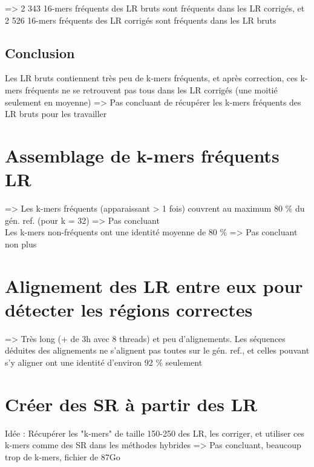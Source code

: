 \documentclass[12pt]{article}
\begin{document}
=> 2 343 16-mers fréquents des LR bruts sont fréquents dans les LR corrigés, et 2 526 16-mers fréquents des LR corrigés sont fréquents dans les LR bruts \\

\subsection{Conclusion}

Les LR bruts contiennent très peu de k-mers fréquents, et après correction, ces k-mers fréquents ne se retrouvent pas tous dans les LR corrigés (une moitié seulement en moyenne) => Pas concluant de récupérer les k-mers fréquents des LR bruts pour les travailler

\section{Assemblage de k-mers fréquents LR}

=> Les k-mers fréquents (apparaissant > 1 fois) couvrent au maximum 80 \% du gén. ref. (pour k = 32) => Pas concluant \\

Les k-mers non-fréquents ont une identité moyenne de 80 \% => Pas concluant non plus

\section{Alignement des LR entre eux pour détecter les régions correctes}

=> Très long (+ de 3h avec 8 threads) et peu d'alignements. Les séquences déduites des alignements ne s'alignent pas toutes sur le gén. ref., et celles pouvant s'y aligner ont une identité d'environ 92 \% seulement

\section{Créer des SR à partir des LR}

Idée : Récupérer les "k-mers" de taille 150-250 des LR, les corriger, et utiliser ces k-mers comme des SR dans les méthodes hybrides => Pas concluant,
beaucoup trop de k-mers, fichier de 87Go \\
\end{document}
